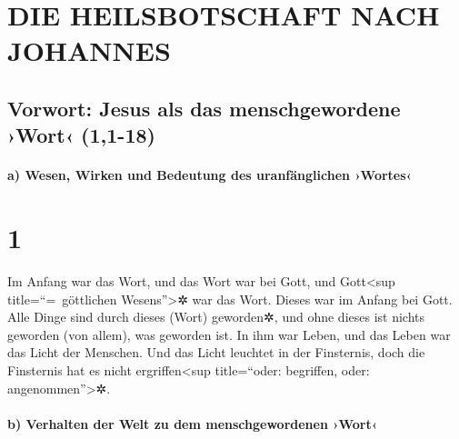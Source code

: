 \hypertarget{die-heilsbotschaft-nach-johannes}{%
\section{DIE HEILSBOTSCHAFT NACH
JOHANNES}\label{die-heilsbotschaft-nach-johannes}}

\hypertarget{vorwort-jesus-als-das-menschgewordene-wort-11-18}{%
\subsection{Vorwort: Jesus als das menschgewordene ›Wort‹
(1,1-18)}\label{vorwort-jesus-als-das-menschgewordene-wort-11-18}}

\hypertarget{a-wesen-wirken-und-bedeutung-des-uranfuxe4nglichen-wortes}{%
\paragraph{a) Wesen, Wirken und Bedeutung des uranfänglichen
›Wortes‹}\label{a-wesen-wirken-und-bedeutung-des-uranfuxe4nglichen-wortes}}

\hypertarget{section}{%
\section{1}\label{section}}

 Im Anfang war das Wort, und das Wort war bei Gott, und
Gott\textless sup title=``=~göttlichen Wesens''\textgreater✲ war das
Wort.  Dieses war im Anfang bei Gott.  Alle
Dinge sind durch dieses (Wort) geworden✲, und ohne dieses ist nichts
geworden (von allem), was geworden ist.  In ihm war Leben,
und das Leben war das Licht der Menschen.  Und das Licht
leuchtet in der Finsternis, doch die Finsternis hat es nicht
ergriffen\textless sup title=``oder: begriffen, oder:
angenommen''\textgreater✲.

\hypertarget{b-verhalten-der-welt-zu-dem-menschgewordenen-wort}{%
\paragraph{b) Verhalten der Welt zu dem menschgewordenen
›Wort‹}\label{b-verhalten-der-welt-zu-dem-menschgewordenen-wort}}

